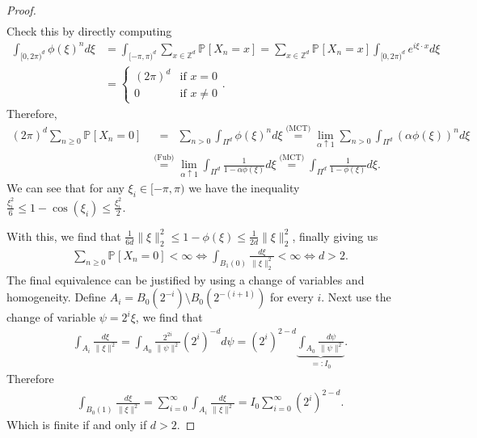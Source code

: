 \begin{proof}
\begin{align}
\end{align}
Check this by directly computing
\begin{align}
	\int_{[0, 2\pi)^d}^{} \phi(\xi)^n d\xi &= \int_{[-\pi, \pi)^d}^{} \sum_{x \in \mathbb{Z}^d}^{} \mathbb{P}_{} \left[ X_n = x \right] = \sum_{x \in \mathbb{Z}^d}^{} \mathbb{P}_{} \left[ X_n = x \right] \int_{[0, 2 \pi)^d}^{} e^{i \xi \cdot x} d\xi  \\
	&= 
	\begin{cases}
		(2 \pi)^d & \textrm{if }x = 0 \\
		0 & \textrm{if } x \neq 0
	\end{cases}.
\end{align}
Therefore,
\begin{align}
	(2 \pi )^d \sum_{n\geq 0}^{} \mathbb{P}_{} \left[ X_n =0 \right] 
		&\stackrel{\phantom{\textrm{(Fub)}}}{=} \sum_{n> 0}^{} \int_{\Pi^d}^{} \phi(\xi)^n d \xi 
		\stackrel{\textrm{(MCT)}}{=} \lim_{\alpha \uparrow 1} \sum_{n> 0}^{} \int_{\Pi^d}^{} (\alpha \phi(\xi))^n d\xi \\
	& \stackrel{\textrm{(Fub)}}{=} \lim_{\alpha \uparrow 1} \int_{\Pi^d}^{}  \frac{1}{1-\alpha \phi(\xi)} d \xi 
		\stackrel{\textrm{(MCT)}}{=} \int_{\Pi^d}^{} \frac{1}{1-\phi(\xi)} d \xi
.\end{align}
We can see that for any $\xi_i \in [-\pi, \pi )$ we have the inequality $\frac{\xi_i^2}{6} \leq 1 - \cos(\xi_i) \leq \frac{\xi_i^2}{2}$. 

With this, we find that $\frac{1}{6d}\| \xi \|_2^2 \leq 1 - \phi(\xi) \leq \frac{1}{2d} \| \xi \|_2^2$, finally giving us
\begin{align}
	\sum_{n\geq 0}^{} \mathbb{P}_{} \left[  X_n = 0\right] < \infty \iff \int_{B_1(0)}^{} \frac{d\xi}{\| \xi \|_2^2} < \infty \iff d>2.
\end{align}
The final equivalence can be justified by using a change of variables and homogeneity. Define $A_i = B_0(2^{-i}) \setminus B_0(2^{-(i+1)})$ for every $i$. Next use the change of variable $\psi = 2^{i}\xi$, we find that
\begin{align}
	\int_{A_i}^{} \frac{d\xi}{\| \xi \|^2} = \int_{A_0}^{} \frac{2^{2i}}{\| \psi \|^2} (2^{i})^{-d} d\psi
	= (2^{i})^{2-d} \underbrace{ \int_{A_0}\frac{d\psi}{\| \psi\|^2}}_{=: I_0}.
\end{align}
Therefore 
\begin{align}
	\int_{B_0(1)}^{} \frac{d \xi}{\| \xi \|^2} = \sum_{i=0}^{\infty} \int_{A_i}^{} \frac{d\xi}{\| \xi\| ^2} = I_0 \sum_{i=0}^{\infty} (2^i)^{2-d}.
\end{align}
Which is finite if and only if $d>2$.
\end{proof}

